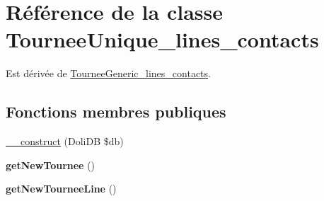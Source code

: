 \hypertarget{classTourneeUnique__lines__contacts}{}\section{Référence de la classe Tournee\+Unique\+\_\+lines\+\_\+contacts}
\label{classTourneeUnique__lines__contacts}


Est dérivée de \hyperlink{classTourneeGeneric__lines__contacts}{Tournee\+Generic\+\_\+lines\+\_\+contacts}.

\subsection*{Fonctions membres publiques}
\begin{DoxyCompactItemize}
\item 
\hyperlink{classTourneeUnique__lines__contacts_aacce69261ed9384fa8ae5bc952ea336d}{\+\_\+\+\_\+construct} (Doli\+DB \$db)
\item 
\mbox{\label{classTourneeUnique__lines__contacts_a50503951e4004395def8cca7bd4e38df}} 
{\bfseries get\+New\+Tournee} ()
\item 
\mbox{\label{classTourneeUnique__lines__contacts_af67961cc931fd3fd6db4ae6d5546b947}} 
{\bfseries get\+New\+Tournee\+Line} ()
\end{DoxyCompactItemize}
